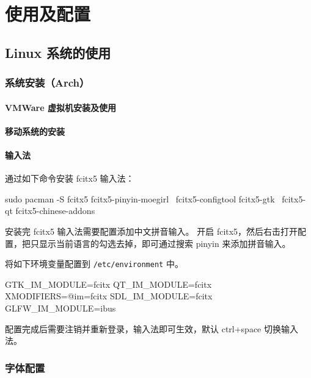 \chapter{使用及配置}

\section{Linux 系统的使用}

\subsection{系统安装（Arch）}

\subsubsection{VMWare 虚拟机安装及使用}

\subsubsection{移动系统的安装}

\subsubsection{输入法}

通过如下命令安装 fcitx5 输入法：

\begin{lstcode}
  sudo pacman -S fcitx5 fcitx5-pinyin-moegirl \
        fcitx5-configtool fcitx5-gtk \
        fcitx5-qt fcitx5-chinese-addons
\end{lstcode}

安装完 fcitx5 输入法需要配置添加中文拼音输入。
开启 fcitx5，然后右击打开配置，把只显示当前语言的勾选去掉，即可通过搜索 pinyin 来添加拼音输入。


将如下环境变量配置到 \lstinline{/etc/environment} 中。

\begin{lstcode}
  GTK_IM_MODULE=fcitx
  QT_IM_MODULE=fcitx
  XMODIFIERS=@im=fcitx
  SDL_IM_MODULE=fcitx
  GLFW_IM_MODULE=ibus
\end{lstcode}

配置完成后需要注销并重新登录，输入法即可生效，默认 ctrl+space 切换输入法。

\subsection{字体配置}

